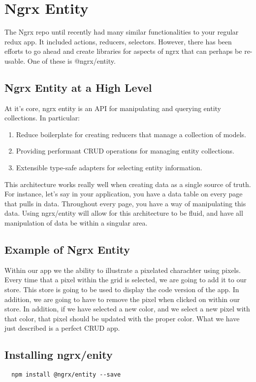 
\section{ Ngrx Entity }

The Ngrx repo until recently had many similar functionalities to your regular
redux app. It included actions, reducers, selectors. However, there has been
efforts to go ahead and create libraries for aspects of ngrx that can perhaps
be re-usable. One of these is @ngrx/entity.

\subsection{ Ngrx Entity at a High Level }
At it's core, ngrx entity is an API for manipulating and querying entity
collections. In particular:
\begin{enumerate}
  \item Reduce boilerplate for creating reducers that manage a collection of
  models.
  \item Providing performant CRUD operations for managing entity collections.
  \item Extensible type-safe adapters for selecting entity information.
\end{enumerate}

This architecture works really well when creating data as a single source of
truth. For instance, let's say in your application, you have a data table on
every page that pulls in data. Throughout every page, you have a way of
manipulating this data. Using ngrx/entity will allow for this architecture to
be fluid, and have all manipulation of data be within a singular area.

\subsection{ Example of Ngrx Entity }
Within our app we the ability to illustrate a pixelated charachter using pixels.
Every time that a pixel within the grid is selected, we are going to add it to
our store. This store is going to be used to display the code version of the
app. In addition, we are going to have to remove the pixel when clicked on
within our store. In addition, if we have selected a new color, and we select a
new pixel with that color, that pixel should be updated with the proper color.
What we have just described is a perfect CRUD app.

\subsection{ Installing ngrx/enity }
\begin{verbatim}
  npm install @ngrx/entity --save
\end{verbatim}

